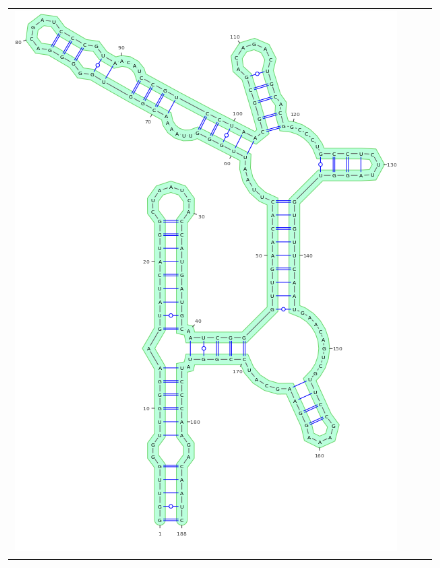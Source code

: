 \documentclass[11pt]{article} %
\begin{document}
{\begin{figure}
{\begin{adjustbox}{max width=\textwidth,max height=\textheight,keepaspectratio}
\begin{tabular}{@{}ccc@{}}
 \includegraphics[scale=\MyScale]{graphs/Supp_structures/1M7MgCE_NMIAMgCE}
 &

\end{tabular}
\end{adjustbox}}
\end{figure}}
\end{document}
